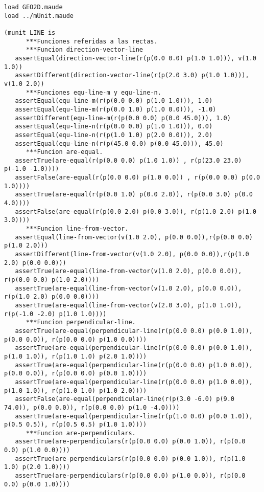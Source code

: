 \documentclass[12pt,a4paper]{book}
\begin{document}
\begin{verbatim}
load GEO2D.maude
load ../mUnit.maude

(munit LINE is
      ***Funciones referidas a las rectas.
      ***Funcion direction-vector-line
   assertEqual(direction-vector-line(r(p(0.0 0.0) p(1.0 1.0))), v(1.0 1.0))	
   assertDifferent(direction-vector-line(r(p(2.0 3.0) p(1.0 1.0))), v(1.0 2.0))
      ***Funciones equ-line-m y equ-line-n.
   assertEqual(equ-line-m(r(p(0.0 0.0) p(1.0 1.0))), 1.0)
   assertEqual(equ-line-m(r(p(0.0 1.0) p(1.0 0.0))), -1.0)
   assertDifferent(equ-line-m(r(p(0.0 0.0) p(0.0 45.0))), 1.0)
   assertEqual(equ-line-n(r(p(0.0 0.0) p(1.0 1.0))), 0.0)
   assertEqual(equ-line-n(r(p(1.0 1.0) p(2.0 0.0))), 2.0)
   assertEqual(equ-line-n(r(p(45.0 0.0) p(0.0 45.0))), 45.0)
      ***Funcion are-equal.
   assertTrue(are-equal(r(p(0.0 0.0) p(1.0 1.0)) , r(p(23.0 23.0) p(-1.0 -1.0))))
   assertFalse(are-equal(r(p(0.0 0.0) p(1.0 0.0)) , r(p(0.0 0.0) p(0.0 1.0))))
   assertTrue(are-equal(r(p(0.0 1.0) p(0.0 2.0)), r(p(0.0 3.0) p(0.0 4.0))))
   assertFalse(are-equal(r(p(0.0 2.0) p(0.0 3.0)), r(p(1.0 2.0) p(1.0 3.0))))
      ***Funcion line-from-vector.
   assertEqual(line-from-vector(v(1.0 2.0), p(0.0 0.0)),r(p(0.0 0.0) p(1.0 2.0)))
   assertDifferent(line-from-vector(v(1.0 2.0), p(0.0 0.0)),r(p(1.0 2.0) p(0.0 0.0)))
   assertTrue(are-equal(line-from-vector(v(1.0 2.0), p(0.0 0.0)), r(p(0.0 0.0) p(1.0 2.0))))
   assertTrue(are-equal(line-from-vector(v(1.0 2.0), p(0.0 0.0)), r(p(1.0 2.0) p(0.0 0.0))))
   assertTrue(are-equal(line-from-vector(v(2.0 3.0), p(1.0 1.0)), r(p(-1.0 -2.0) p(1.0 1.0))))
      ***Funcion perpendicular-line.
   assertTrue(are-equal(perpendicular-line(r(p(0.0 0.0) p(0.0 1.0)), p(0.0 0.0)), r(p(0.0 0.0) p(1.0 0.0))))
   assertTrue(are-equal(perpendicular-line(r(p(0.0 0.0) p(0.0 1.0)), p(1.0 1.0)), r(p(1.0 1.0) p(2.0 1.0))))
   assertTrue(are-equal(perpendicular-line(r(p(0.0 0.0) p(1.0 0.0)), p(0.0 0.0)), r(p(0.0 0.0) p(0.0 1.0))))
   assertTrue(are-equal(perpendicular-line(r(p(0.0 0.0) p(1.0 0.0)), p(1.0 1.0)), r(p(1.0 1.0) p(1.0 2.0))))
   assertFalse(are-equal(perpendicular-line(r(p(3.0 -6.0) p(9.0 74.0)), p(0.0 0.0)), r(p(0.0 0.0) p(1.0 -4.0))))
   assertTrue(are-equal(perpendicular-line(r(p(1.0 0.0) p(0.0 1.0)), p(0.5 0.5)), r(p(0.5 0.5) p(1.0 1.0))))
      ***Funcion are-perpendiculars.
   assertTrue(are-perpendiculars(r(p(0.0 0.0) p(0.0 1.0)), r(p(0.0 0.0) p(1.0 0.0))))
   assertTrue(are-perpendiculars(r(p(0.0 0.0) p(0.0 1.0)), r(p(1.0 1.0) p(2.0 1.0))))
   assertTrue(are-perpendiculars(r(p(0.0 0.0) p(1.0 0.0)), r(p(0.0 0.0) p(0.0 1.0))))

\end{verbatim}
\end{document}
